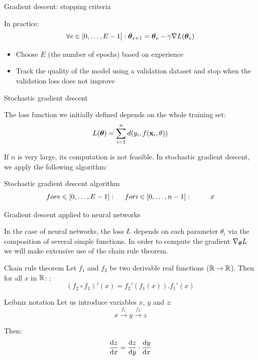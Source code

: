 \documentclass[xcolor=pdftex,dvipsnames,table,mathserif]{beamer}
\begin{document}
\begin{frame}{Gradient descent: stopping criteria}

  In practice:
  \[
  \forall e \in [0, \ldots, E-1]: \boldsymbol{\theta}_{e+1} = \boldsymbol{\theta}_e - \gamma \nabla L(\boldsymbol{\theta}_e)
  \]

\begin{itemize}
\item Choose $E$ (the number of \alert{epochs}) based on experience
\item Track the quality of the model using a validation dataset and stop when the validation loss does not improve
\end{itemize}


\end{frame}
\begin{frame}{Stochastic gradient descent}

  The loss function we initially defined depends on the whole training set:
  \[
  L(\boldsymbol{\theta}) = \sum\limits_{i=1}^n d(y_i, f(\mathbf{x}_i, \theta))
  \]

  If $n$ is very large, its computation is not feasible. In \alert{stochastic gradient descent}, we apply the following algorithm:

  \begin{block}{Stochastic gradient descent algorithm}
    \[
    for e \in [0, \ldots, E-1]:\\
    ~~~~ for i \in [0, \ldots, n-1]:\\
    ~~~~ ~~~~x
    \]
  \end{block}

\end{frame}

\begin{frame}{Gradient descent applied to neural networks}

  In the case of neural networks, the loss $L$ depends on each parameter $\theta_i$ via the composition of several simple functions. In order to compute the gradient $\nabla_{\boldsymbol{\theta}}L$ we will make extensive use of the chain rule theorem.

  \begin{block}{Chain rule theorem}
    Let $f_1$ and $f_2$ be two derivable real functions ($\mathbb{R} \rightarrow \mathbb{R}$). Then for all $x$ in $\mathbb{R}$:   :
    \[
     (f_2 \circ f_1)'(x) = f_2'(f_1(x)).f_1'(x)
    \]
  \end{block}


\begin{block}{Leibniz notation}
  Let us introduce variables $x$, $y$ and $z$:
  \[x \xrightarrow{f_1} y \xrightarrow{f_2} z\]

  Then:
  \[\dv{z}{x} = \dv{z}{y} \cdot \dv{y}{x} \]

\end{block}

\end{frame}
\end{document}
